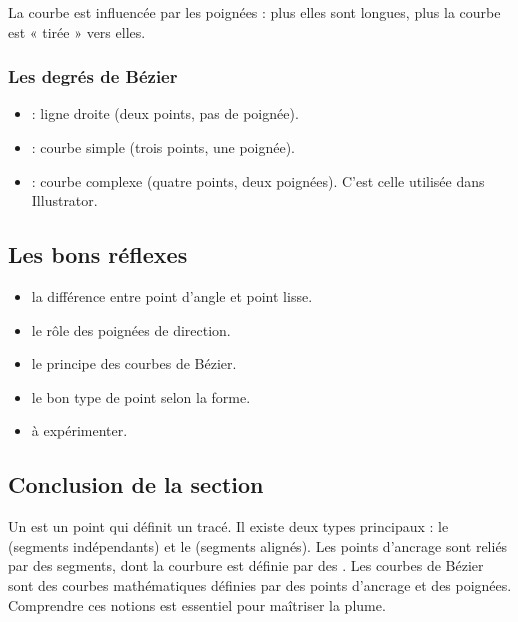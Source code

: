 La courbe est influencée par les poignées : plus elles sont longues, plus la courbe est « tirée » vers elles.

\subsubsection{Les degrés de Bézier}

\begin{itemize}
    \item {} : ligne droite (deux points, pas de poignée).
    \item {} : courbe simple (trois points, une poignée).
    \item {} : courbe complexe (quatre points, deux poignées). C'est celle utilisée dans Illustrator.
\end{itemize}

\subsection{Les bons réflexes}

\begin{itemize}
    \item {} la différence entre point d'angle et point lisse.
    \item {} le rôle des poignées de direction.
    \item {} le principe des courbes de Bézier.
    \item {} le bon type de point selon la forme.
    \item {} à expérimenter.
\end{itemize}

\subsection*{Conclusion de la section}

Un  est un point qui définit un tracé. Il existe deux types principaux : le  (segments indépendants) et le  (segments alignés). Les points d'ancrage sont reliés par des segments, dont la courbure est définie par des . Les courbes de Bézier sont des courbes mathématiques définies par des points d'ancrage et des poignées. Comprendre ces notions est essentiel pour maîtriser la plume.

